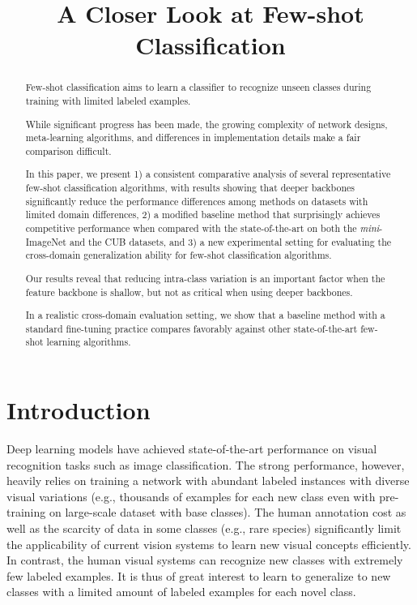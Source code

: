 \title{A Closer Look at Few-shot Classification}

\begin{abstract}
Few-shot classification aims to learn a classifier to recognize unseen classes during training with limited labeled examples.

While significant progress has been made, the growing complexity of network designs, meta-learning algorithms, and differences in implementation details make a fair comparison difficult.

In this paper, we present 1) a consistent comparative analysis of several representative few-shot classification algorithms, with results showing that deeper backbones significantly reduce the performance differences among methods on datasets with limited domain differences, 2) a modified baseline method that surprisingly achieves competitive performance when compared with the state-of-the-art on both the \emph{mini}-ImageNet  and the CUB datasets, and 3) a new experimental setting for evaluating the cross-domain generalization ability for few-shot classification algorithms.

Our results reveal that reducing intra-class variation is an important factor when the feature backbone is shallow, but not as critical when using deeper backbones.

In a realistic cross-domain evaluation setting, we show that a baseline method with a standard fine-tuning practice compares favorably against other state-of-the-art few-shot learning algorithms.
\end{abstract}

\section{Introduction}
\label{sec:intro}

Deep learning models have achieved state-of-the-art performance on visual recognition tasks such as image classification. The strong performance, however, heavily relies on training a network with abundant labeled instances with diverse visual variations (e.g., thousands of examples for each new class even with pre-training on large-scale dataset with base classes). The human annotation cost as well as the scarcity of data in some classes (e.g., rare species) significantly limit the applicability of current vision systems to learn new visual concepts efficiently. In contrast, the human visual systems can recognize new classes with extremely few labeled examples. It is thus of great interest to learn to generalize to new classes with a limited amount of labeled examples for each novel class.

